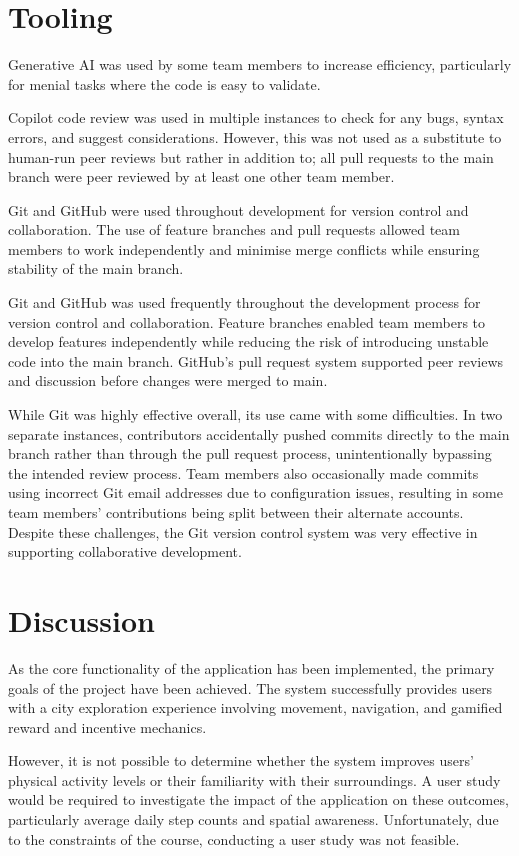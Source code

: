 \documentclass{vgtc}                          %
\begin{document}
\section{Tooling}

Generative AI was used by some team members to increase efficiency, particularly for menial tasks where the code is easy to validate. 

Copilot code review was used in multiple instances to check for any bugs, syntax errors, and suggest considerations. However, this was not used as a substitute to human-run peer reviews but rather in addition to; all pull requests to the main branch were peer reviewed by at least one other team member.

Git and GitHub were used throughout development for version control and collaboration. The use of feature branches and pull requests allowed team members to work independently and minimise merge conflicts while ensuring stability of the main branch. 

Git and GitHub was used frequently throughout the development process for version control and collaboration. Feature branches enabled team members to develop features independently while reducing the risk of introducing unstable code into the main branch. GitHub's pull request system supported peer reviews and discussion before changes were merged to main.

While Git was highly effective overall, its use came with some difficulties. In two separate instances, contributors accidentally pushed commits directly to the main branch rather than through the pull request process, unintentionally bypassing the intended review process. Team members also occasionally made commits using incorrect Git email addresses due to configuration issues, resulting in some team members' contributions being split between their alternate accounts. Despite these challenges, the Git version control system was very effective in supporting collaborative development.

\section{Discussion}

As the core functionality of the application has been implemented, the primary goals of the project have been achieved. The system successfully provides users with a city exploration experience involving movement, navigation, and gamified reward and incentive mechanics.

However, it is not possible to determine whether the system improves users' physical activity levels or their familiarity with their surroundings. A user study would be required to investigate the impact of the application on these outcomes, particularly average daily step counts and spatial awareness. Unfortunately, due to the constraints of the course, conducting a user study was not feasible.
\end{document}
